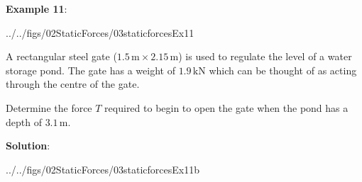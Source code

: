 \documentclass[10pt,onesided]{amsart}
\begin{document}
\begin{minipage}[t]{0.4\textwidth}
	\textbf{Example 11}:\\
	\begin{cfig}[0.5]{../../figs/02StaticForces/03staticforcesEx11}\end{cfig}
	\raggedright
	A rectangular steel gate ($1.5\,\text{m}\times2.15\,\text{m}$) is used to regulate the level of a water storage pond.
	The gate has a weight of $1.9\,\text{kN}$ which can be thought of as acting through the centre of the gate.\par \bigskip
	Determine the force $T$ required to begin to open the gate when the pond has a depth of $3.1\,\text{m}$.
	\par\bigskip
	\textbf{Solution}:
	\par\bigskip
	\begin{cfig}[0.5]{../../figs/02StaticForces/03staticforcesEx11b}\end{cfig}
\end{minipage}
\hfill
\end{document}
